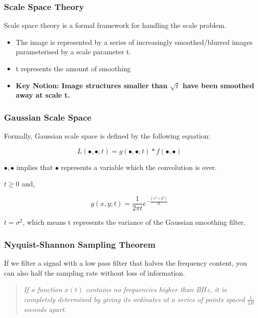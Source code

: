 \subsubsection{Scale Space Theory}
Scale space theory is a formal framework for handling the scale problem.

\begin{itemize}
    \itemsep0em
    \item The image is represented by a series of increasingly smoothed/blurred images parameterised by a scale parameter t.
    \item t represents the amount of smoothing
    \item \textbf{Key Notion: Image structures smaller than $\sqrt{t}$ have been smoothed away at scale t.}
\end{itemize}

\subsubsection{Gaussian Scale Space}
Formally, Gaussian scale space is defined by the following equation:

\begin{equation}
    L(∙,∙;t) = g(∙,∙;t) * f(∙,∙)
\end{equation}

$∙,∙$ implies that $∙$ represents a variable which the convolution is over.

\noindent $t \geq 0$ and,

\begin{equation}
    g(x,y;t) = \frac{1}{2\pi t}e^{-\frac{ (x^2 + y^2)}{2t}}
\end{equation}

$t=\sigma^2$, which means t represents the variance of the Gaussian smoothing filter.

\subsubsection{Nyquist-Shannon Sampling Theorem}

If we filter a signal with a low pass filter that halves the frequency content, you can also half the sampling rate without loss of information.

\begin{quote}
    \textit{If a function $x(t)$ contains no frequencies higher than B$Hz$, it is completely determined by giving its ordinates at a series of points spaced $\frac{1}{2B}$ seconds apart.}
\end{quote}

